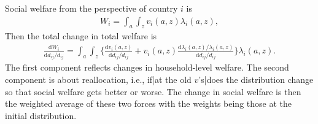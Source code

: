 \documentclass[12pt,pdftex]{article}
\begin{document}
\begin{onehalfspacing}
Social welfare from the perspective of country $i$ is
\begin{align}
W_{i} = \int_{a}\int_{z}  v_{i}(a,z)\lambda_{i}(a,z),
\label{eq:apx-social-welfare}
\end{align}
Then the total change in total welfare is
\begin{align}
\frac{\mathrm{d} W_{i}}{\mathrm{d} d_{ij} / d_{ij}} = \int_{a}\int_{z}  \bigg \{ \frac{\mathrm{d} v_i(a, z)}{\mathrm{d} d_{ij} / d_{ij}}  + v_{i}(a,z) \frac{\mathrm{d} \lambda_{i}(a,z)/ \lambda_{i}(a,z)}{\mathrm{d} d_{ij} / d_{ij}}  \bigg \} \lambda_{i}(a,z).
\label{eq:apx-social-welfare-change}
\end{align}
The first component reflects changes in household-level welfare. The second component is about reallocation, i.e., if|at the old $v$'s|does the distribution change so that social welfare gets better or worse. The change in social welfare is then the weighted average of these two forces with the weights being those at the initial distribution.


\end{onehalfspacing}
\end{document}
